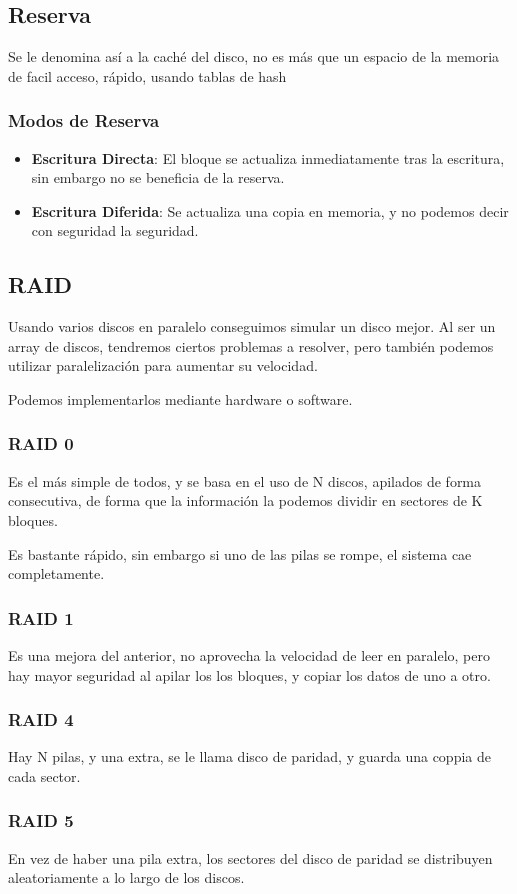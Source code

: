 \subsection{Reserva}
Se le denomina así a la caché del disco, no es más que un espacio de la memoria de facil acceso, rápido, usando tablas de hash
\subsubsection{Modos de Reserva}
\begin{itemize}
        \item \textbf{Escritura Directa}: El bloque se actualiza inmediatamente tras la escritura, sin embargo no se beneficia de la reserva.
        \item \textbf{Escritura Diferida}: Se actualiza una copia en memoria, y no podemos decir con seguridad la seguridad.
\end{itemize}
\subsection{RAID}
Usando varios discos en paralelo conseguimos simular un disco mejor. Al ser un array de discos, tendremos ciertos problemas a resolver, pero también podemos utilizar paralelización para aumentar su velocidad.
\par  Podemos implementarlos mediante hardware o software.
\subsubsection{RAID 0}
Es el más simple de todos, y se basa en el uso de N discos, apilados de forma consecutiva, de forma que la información la podemos dividir en sectores de K bloques.
\par  Es bastante rápido, sin embargo si uno de las pilas se rompe, el sistema cae completamente.
\subsubsection{RAID 1}
Es una mejora del anterior, no aprovecha la velocidad de leer en paralelo, pero hay mayor seguridad al apilar los los bloques, y copiar los datos de uno a otro.
\subsubsection{RAID 4}
Hay N pilas, y una extra, se le llama disco de paridad, y guarda una coppia de cada sector.
\subsubsection{RAID 5}
En vez de haber una pila extra, los sectores del disco de paridad se distribuyen aleatoriamente a lo largo de los discos.
